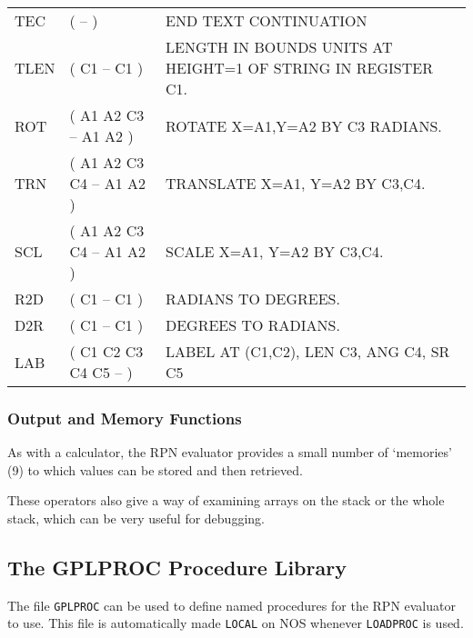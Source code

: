 \documentclass[a4paper,twoside,11pt]{article}
\newcommand{\newpara}{\par\vspace{4mm}\noindent}
\begin{document}
\begin{small}
{\begin{tabular}{|| l | l  | l ||}
TEC & ( -- ) & END TEXT CONTINUATION \\
TLEN & ( C1 -- C1 ) & LENGTH IN BOUNDS UNITS AT HEIGHT=1 OF STRING IN REGISTER C1. \\
ROT & ( A1 A2 C3 -- A1 A2 ) & ROTATE X=A1,Y=A2 BY C3 RADIANS. \\
TRN & ( A1 A2 C3 C4 -- A1 A2 ) & TRANSLATE X=A1, Y=A2 BY C3,C4. \\
SCL & ( A1 A2 C3 C4 -- A1 A2 ) & SCALE X=A1, Y=A2 BY C3,C4. \\
R2D & ( C1 -- C1 ) & RADIANS TO DEGREES. \\
D2R & ( C1 -- C1 ) & DEGREES TO RADIANS. \\
LAB & ( C1 C2 C3 C4 C5 -- ) & LABEL AT (C1,C2), LEN C3, ANG C4, SR C5 \\
\hline
\end{tabular}
}
\end{small}

\subsubsection{Output and Memory Functions}
As with a calculator, the RPN evaluator provides a small number of `memories' (9) to which values can be stored
and then retrieved.
\newpara
These operators also give a way of examining arrays on the stack or the whole stack, which can be very useful for debugging. 
\newpara
{}

\subsection{The GPLPROC Procedure Library}\label{gplproc-sect}
\newpara
The file \texttt{GPLPROC} can be used to define named procedures for the RPN evaluator to use. This file is
automatically made \texttt{LOCAL} on NOS whenever \texttt{LOADPROC} is used.
\end{document}
